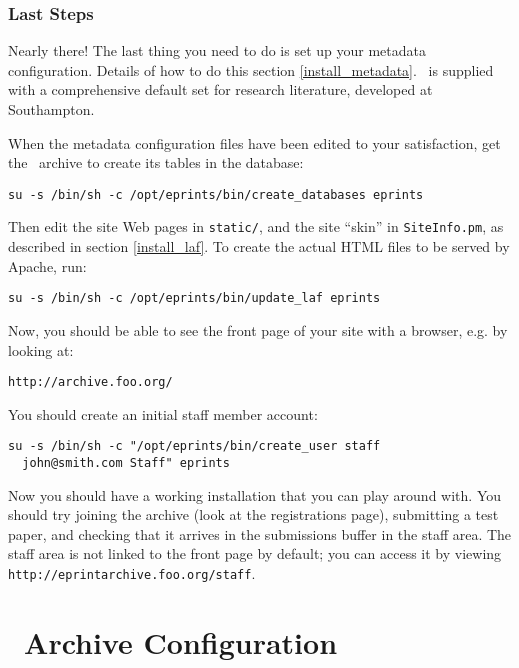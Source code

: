 \subsubsection{Last Steps}
\label{install_last_steps}

Nearly there! The last thing you need to do is set up your metadata configuration. Details of how to do this section \ref{install_metadata}. \eprints\ is supplied with a comprehensive default set for research literature, developed at Southampton.

When the metadata configuration files have been edited to your satisfaction, get the \eprints\ archive to create its tables in the database:

\begin{verbatim}
su -s /bin/sh -c /opt/eprints/bin/create_databases eprints
\end{verbatim}

Then edit the site Web pages in {\tt static/}, and the site ``skin'' in {\tt SiteInfo.pm}, as described in section \ref{install_laf}. To create the actual HTML files to be served by Apache, run:

\begin{verbatim}
su -s /bin/sh -c /opt/eprints/bin/update_laf eprints
\end{verbatim}

Now, you should be able to see the front page of your site with a browser, e.g. by looking at:

\begin{verbatim}
http://archive.foo.org/
\end{verbatim}

You should create an initial staff member account:

\begin{verbatim}
su -s /bin/sh -c "/opt/eprints/bin/create_user staff
  john@smith.com Staff" eprints
\end{verbatim}


Now you should have a working installation that you can play around with. You should try joining the archive (look at the registrations page), submitting a test paper, and checking that it arrives in the submissions buffer in the staff area. The staff area is not linked to the front page by default; you can access it by viewing {\tt http://eprintarchive.foo.org/staff}.


\section{\eprints\ Archive Configuration}
\label{install_configure}

